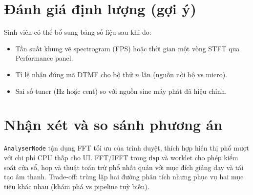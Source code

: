 \section{Đánh giá định lượng (gợi ý)}
Sinh viên có thể bổ sung bảng số liệu sau khi đo:
\begin{itemize}\itemsep2pt
	\item Tần suất khung vẽ spectrogram (FPS) hoặc thời gian một vòng STFT qua Performance panel.
	\item Tỉ lệ nhận đúng mã DTMF cho bộ thử $n$ lần (nguồn nội bộ vs micro).
	\item Sai số tuner (Hz hoặc cent) so với nguồn sine máy phát đã hiệu chỉnh.
\end{itemize}

\section{Nhận xét và so sánh phương án}
\texttt{AnalyserNode} tận dụng FFT tối ưu của trình duyệt, thích hợp hiển thị phổ mượt với chi phí CPU thấp cho UI. FFT/IFFT trong \texttt{dsp} và worklet cho phép kiểm soát cửa sổ, hop và thuật toán trừ phổ nhất quán với mục đích giảng dạy và tái tạo âm thanh. Trade-off: trùng lặp hai đường phân tích nhưng phục vụ hai mục tiêu khác nhau (khám phá vs pipeline tuỳ biến).
